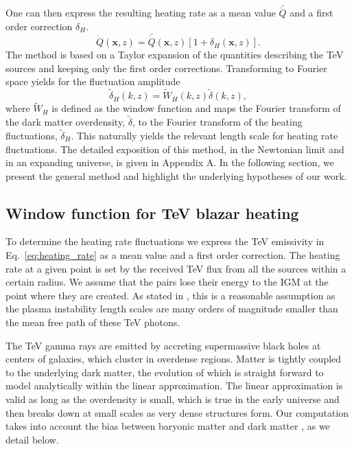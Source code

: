 \documentclass[numberedappendix]{emulateapj}
\newcommand\Cc[1]{{\color{blue} \bf #1}} %
\begin{document}
One can then express the resulting heating rate as a mean value $\bar{\dot{Q}}$ and a first order correction $\delta_H$.
\begin{equation}
\label{eq:delta_h}
\dot{Q}(\mathbf{x},z)=\bar{\dot{Q}}(\mathbf{x},z)\left[1+\delta_H(\mathbf{x},z)\right].
\end{equation}
The method is based on a Taylor expansion of the quantities describing the TeV sources and keeping only the first order corrections. Transforming to Fourier space yields for the fluctuation amplitude
\begin{equation}
\label{eq:use_window}
\tilde{\delta}_H(k,z)=\tilde{W}_H(k,z)\tilde{\delta}(k,z),
\end{equation}
where $\tilde{W}_H$ is defined as the window function and maps the Fourier transform of the dark matter overdensity, $\tilde{\delta}$, to the Fourier transform of the heating fluctuations, $\tilde{\delta}_H$. This naturally yields the relevant length scale for heating rate fluctuations. %
The detailed exposition of this method, in the Newtonian limit and in an expanding universe, is given in Appendix A. In the following section, we present the general method and highlight the underlying hypotheses of our work.
\subsection{Window function for TeV blazar heating}\label{sec:window}
To determine the heating rate fluctuations we express the TeV emissivity in Eq.~\eqref{eq:heating_rate} as a mean value and a first order correction. The heating rate at a given point is set by the received TeV flux from all the sources within a certain radius. We assume that the pairs lose their energy to the IGM at the point where they are created. As stated in \citet{2012ApJ...752...22B}, this is a reasonable assumption as the plasma instability length scales are many orders of magnitude smaller than the mean free path of these TeV photons.

The TeV gamma rays are emitted by accreting supermassive black holes at centers of galaxies, which cluster in overdense regions. Matter is tightly coupled to the underlying dark matter, the evolution of which is straight forward to model analytically within the linear approximation. The linear approximation is valid as long as the overdensity is small, which is true in the early universe and then breaks down at small scales as very dense structures form. Our computation takes into account the bias between baryonic matter and dark matter \citep{1996MNRAS.282..347M}, as we detail below.
\end{document}
